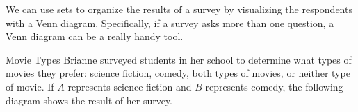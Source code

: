 \setcounter{ExampleCounter}{1}
We can use sets to organize the results of a survey by visualizing the respondents with a Venn diagram.  Specifically, if a survey asks more than one question, a Venn diagram can be a really handy tool.

\begin{example}{Movie Types}
Brianne surveyed students in her school to determine what types of movies they prefer: science fiction, comedy, both types of movies, or neither type of movie.  If $A$ represents science fiction and $B$ represents comedy, the following diagram shows the result of her survey.

\begin{center}
\end{center}


\end{example}
